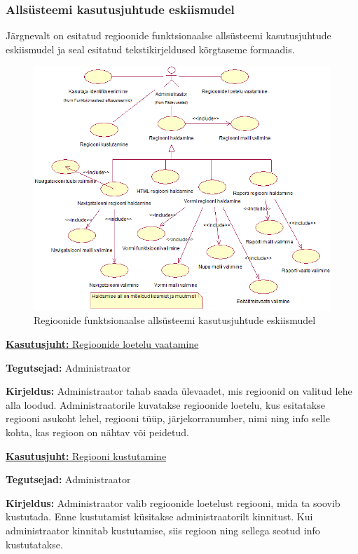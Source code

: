 \documentclass[a4paper,12pt]{article} %
\begin{document}
\subsubsection{Allsüsteemi kasutusjuhtude eskiismudel}
Järgnevalt on esitatud regioonide funktsionaalse allsüsteemi kasutusjuhtude eskiismudel ja seal esitatud tekstikirjeldused kõrgtaseme formaadis.
\begin{figure}[H]
\begin{center}
\includegraphics[bb=0 0 709 615,scale=0.85]{./diagrams/regions-subsystem-use-case-digram.png}
\caption{Regioonide funktsionaalse allsüsteemi kasutusjuhtude eskiismudel}
\end{center}
\end{figure}

\underline{\textbf{Kasutusjuht:} Regioonide loetelu vaatamine}
\par
\textbf{Tegutsejad:} Administraator
\par
\textbf{Kirjeldus:} Administraator tahab saada ülevaadet, mis regioonid on valitud lehe alla loodud. Administraatorile kuvatakse regioonide loetelu, kus esitatakse regiooni asukoht lehel, regiooni tüüp, järjekorranumber, nimi ning info selle kohta, kas regioon on nähtav või peidetud.
\par

\underline{\textbf{Kasutusjuht:} Regiooni kustutamine}
\par
\textbf{Tegutsejad:} Administraator
\par
\textbf{Kirjeldus:} Administraator valib regioonide loetelust regiooni, mida ta soovib kustutada. Enne kustutamist küsitakse administraatorilt kinnitust. Kui administraator kinnitab kustutamise, siis regioon ning sellega seotud info kustutatakse.
\end{document}
